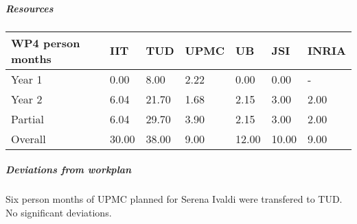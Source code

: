 
\subparagraph{Resources}

\begin{center}
\begin{tabular}{|C{1.5cm}|C{1.5cm}|C{1.5cm}|C{2cm}|C{2cm}|C{2cm}|C{2cm}|}
\hline
\footnotesize \textbf{WP4 person months}& \footnotesize \textbf{IIT}&\footnotesize \textbf{TUD}&\footnotesize \textbf{UPMC}& \footnotesize \textbf{UB} &\footnotesize \textbf{JSI} &\footnotesize \textbf{INRIA}\\ \hline
\footnotesize Year 1 &  0.00 & 8.00 & 2.22 & 0.00 & 0.00 & -     \\  \hline
\footnotesize Year 2 &  6.04 & 21.70 & 1.68 & 2.15 & 3.00 & 2.00     \\  \hline
\footnotesize Partial &  6.04 & 29.70 & 3.90 & 2.15 & 3.00 & 2.00 \\ \hline \hline
\footnotesize Overall &  30.00 & 38.00 & 9.00 & 12.00 & 10.00 & 9.00 \\ \hline
\end{tabular}
\end{center}

\subparagraph{Deviations from workplan} 
Six person months of UPMC planned for Serena Ivaldi were transfered to TUD. No significant deviations. 
